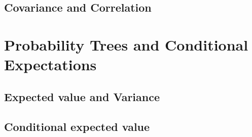 













\subsection{Covariance and Correlation} %

\section{Probability Trees and Conditional Expectations}
\label{sec:Probability Trees and Conditional Expectations}
\subsection{Expected value and Variance} %

\subsection{Conditional expected value} %

